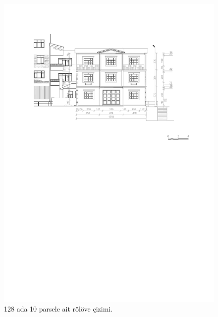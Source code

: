 \begin{figure}
\centering
\includegraphics[width=1\textwidth,height=\textheight]{source/figures/Roloveler/R128-10.pdf}
\caption{128 ada 10 parsele ait rölöve çizimi.}
\end{figure}

